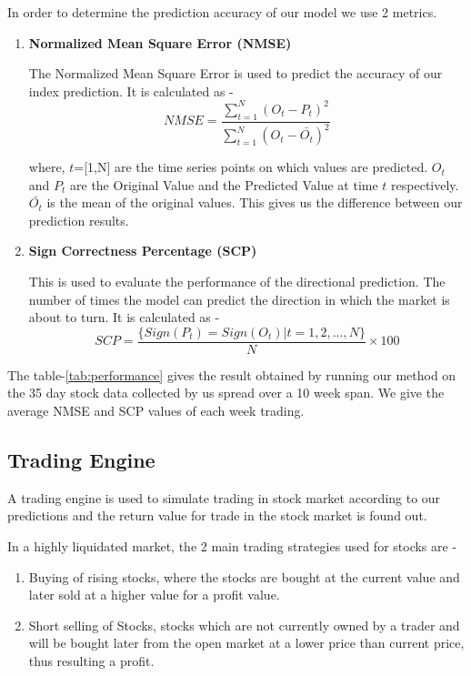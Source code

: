 \documentclass[review,twocolumn,5p]{elsarticle}
\begin{document}
In order to determine the prediction accuracy of our model we use 2 metrics. 

\begin{enumerate}
\item \textbf{Normalized Mean Square Error (NMSE)}

The Normalized Mean Square Error is used to predict the accuracy of our index prediction. It is calculated as - 
\begin{equation}
NMSE = \frac{\sum_{t=1}^{N} (O_t - P_t)^2}{\sum_{t=1}^N (O_t - \bar{O_t})^2}
\end{equation}

where, $t$=[1,N] are the time series points on which values are predicted. $O_t$ and $P_t$ are the Original Value and the Predicted Value at time $t$ respectively. $\bar{O_t}$ is the mean of the original values. This gives us the difference between our prediction results.

\item \textbf{Sign Correctness Percentage (SCP)}

This is used to evaluate the performance of the directional prediction. The number of times the model can predict the direction in which the market is about to turn. It is calculated as -
\begin{equation}
SCP = \frac{\{ Sign(P_t) = Sign(O_t) | t = 1,2,...,N\}}{N} \times 100
\end{equation}
\end{enumerate}

The table-\ref{tab:performance} gives the result obtained by running our method on the 35 day stock data collected by us spread over a 10 week span. We give the average NMSE and SCP values of each week trading. 



\subsection{Trading Engine}
A trading engine is used to simulate trading in stock market according to our predictions and the return value for trade in the stock market is found out. 

In a highly liquidated market, the 2 main trading strategies used for stocks are - 
\begin{enumerate}
\item Buying of rising stocks, where the stocks are bought at the current value and later sold at a higher value for a profit value.
\item Short selling of Stocks, stocks which are not currently owned by a trader and will be bought later from the open market at a lower price than current price, thus resulting a profit.
\end{enumerate}
\end{document}
